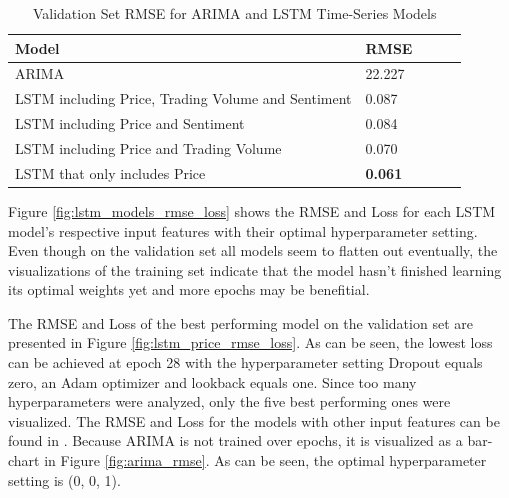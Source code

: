 \documentclass[11pt, a4paper]{article}
\begin{document}
\begin{table}[!htb]
    \caption{Validation Set RMSE for ARIMA and LSTM Time-Series Models}
    \label{tab:results_stocks_valset}
    \centering
    \small

    \begin{tabular}{lllrr}
        \toprule                                        
                            Model       & RMSE  \\
            \midrule
            \multirow{1}{*}{ARIMA}         & 22.227  \\
            \midrule
            \multirow{1}{*}{LSTM including Price, Trading Volume and Sentiment}       & 0.087   \\
            \midrule
            \multirow{1}{*}{LSTM including Price and Sentiment}       & 0.084   \\
            \midrule
            \multirow{1}{*}{LSTM including Price and Trading Volume}      & 0.070    \\
            \midrule
            \multirow{1}{*}{LSTM that only includes Price}      & \textbf{0.061} \\

        \bottomrule
    \end{tabular}

\end{table}

Figure \ref{fig:lstm_models_rmse_loss} shows the RMSE and Loss for each LSTM model's respective input features with their optimal hyperparameter setting.
Even though on the validation set all models seem to flatten out eventually, the visualizations of the training set indicate that the model hasn't finished
learning its optimal weights yet and more epochs may be benefitial.

The RMSE and Loss of the best performing model on the validation set are presented in Figure \ref{fig:lstm_price_rmse_loss}. As can be seen, the lowest loss can be achieved
at epoch 28 with the hyperparameter setting Dropout equals zero, an Adam optimizer and lookback equals one. Since too many hyperparameters
were analyzed, only the five best performing ones were visualized. The RMSE and Loss for the models with other input features can 
be found in .
Because ARIMA is not trained over epochs, it is visualized as a bar-chart in Figure \ref{fig:arima_rmse}. As can be seen, the optimal hyperparameter setting is (0, 0, 1).
\end{document}
